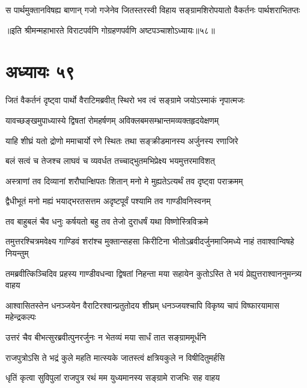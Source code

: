 \twolineshloka
{स पार्थमुक्तानविषह्य बाणान् गजो गजेनेव जितस्तरस्वी}
{विहाय सङ्ग्रामशिरोपयातो वैकर्तनः पार्थशराभितप्तः}

॥इति श्रीमन्महाभारते विराटपर्वणि गोग्रहणपर्वणि अष्टपञ्चाशोऽध्यायः॥५८॥

\chapter{अध्यायः ५९}

\twolineshloka
{जितं वैकर्तनं दृष्ट्वा पार्थो वैराटिमब्रवीत्}
{स्थिरो भव त्वं सङ्ग्रामे जयोऽस्माकं नृपात्मजः}


\twolineshloka
{यावच्छङ्खमुपाध्यास्ये द्विषतां रोमहर्षणम्}
{अविक्लबमसम्भ्रान्तमव्यक्तहृदयेक्षणम्}



\twolineshloka
{याहि शीघ्रं यतो द्रोणो ममाचार्यो रणे स्थितः}
{तथा सङ्क्रीडमानस्य अर्जुनस्य रणाजिरे}


\twolineshloka
{बलं सत्वं च तेजश्च लाघवं च व्यवर्धत}
{तच्चाद्भुतमभिप्रेक्ष्य भयमुत्तरमाविशत्}


\twolineshloka
{अस्त्राणां तव दिव्यानां शरौघान्क्षिपतः शितान्}
{मनो मे मुह्यतेऽत्यर्थं तव दृष्ट्वा पराक्रमम्}


\twolineshloka
{द्वैधीभूतं मनो मह्यं भयाद्भरतसत्तम}
{अदृष्टपूर्वं पश्यामि तव गाण्डीवनिस्वनम्}


\twolineshloka
{तव बाहुबलं चैव धनुः कर्षयतो बहु}
{तव तेजो दुराधर्षं यथा विष्णोस्त्रिविक्रमे}



\twolineshloka
{तमुत्तरश्चित्रमवेक्ष्य गाण्डिवं शरांश्च मुक्तान्सहसा किरीटिना}
{भीतोऽब्रवीदर्जुनमाजिमध्ये नाहं तवाश्वान्विषहे नियन्तुम्}


\twolineshloka
{तमब्रवीत्किञ्चिदिव प्रहस्य गाण्डीवधन्वा द्विषतां निहन्ता}
{मया सहायेन कुतोऽस्ति ते भयं प्रेह्युत्तराश्वाननुमन्त्र्य वाहय}



\twolineshloka
{आश्वासितस्तेन धनञ्जयेन वैराटिरश्वान्प्रतुतोदय शीघ्रम्}
{धनञ्जयश्चापि विकृष्य चापं विष्फारयामास महेन्द्रकल्पः}


\twolineshloka
{उत्तरं चैव बीभत्सुरब्रवीत्पुनरर्जुनः}
{न भेतव्यं मया सार्धं तात सङ्ग्राममूर्धनि}


\twolineshloka
{राजपुत्रोऽसि ते भद्रं कुले महति मात्स्यके}
{जातस्त्वं क्षत्रियकुले न विषीदितुमर्हसि}


\twolineshloka
{धृतिं कृत्वा सुविपुलां राजपुत्र रथं मम}
{युध्यमानस्य सङ्ग्रामे राजभिः सह वाहय}


